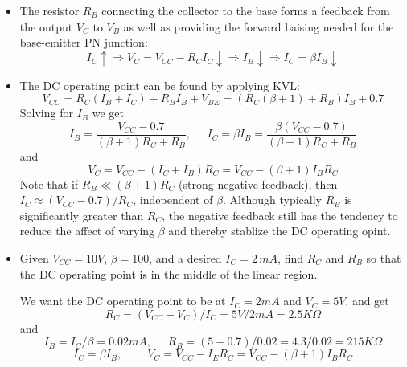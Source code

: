 \documentclass{article}
\begin{document}
\begin{itemize}
\item The resistor $R_B$ connecting the collector to the base forms
  a feedback from the output $V_C$ to $V_B$ as well as providing 
  the forward baising needed for the base-emitter PN junction:
  \begin{equation}
    I_C \uparrow \Longrightarrow V_C=V_{CC}-R_CI_C \downarrow 
    \Longrightarrow I_B\downarrow \Longrightarrow 
    I_C=\beta I_B \downarrow
  \end{equation}

\item The DC operating point can be found by applying KVL:
  \begin{equation}
    V_{CC}=R_C(I_B+I_C)+R_BI_B+V_{BE}=(R_C(\beta+1)+R_B)I_B+0.7
  \end{equation}
  Solving for $I_B$ we get
  \begin{equation} 
    I_B=\frac{V_{CC}-0.7}{(\beta+1)R_C+R_B},\;\;\;\;\;
    I_C=\beta I_B=\frac{\beta(V_{CC}-0.7)}{(\beta+1)R_C+R_B}  
  \end{equation}
  and
  \begin{equation}
    V_C=V_{CC}-(I_C+I_B)R_C=V_{CC}-(\beta+1)I_BR_C
  \end{equation}
  Note that if $R_B \ll (\beta+1)R_C $ (strong negative feedback), 
  then $I_C \approx (V_{CC}-0.7)/R_C$, independent of $\beta$. 
  Although typically $R_B$ is significantly greater than $R_C$, 
  the negative feedback still has the tendency to reduce the affect
  of varying $\beta$ and thereby stablize the DC operating opint.

\item Given $V_{CC}=10V$, $\beta=100$, and a desired $I_C=2\,mA$, find
  $R_C$ and $R_B$ so that the DC operating point is in the middle of the 
  linear region.
  
  We want the DC operating point to be at $I_C=2mA$ and $V_C=5V$, and
  get
  \begin{equation}
  R_C=(V_{CC}-V_C)/I_C=5V/2mA=2.5K\Omega
  \end{equation}
  and
  \begin{equation}
  I_B=I_C/\beta=0.02mA, \;\;\;\;\;R_B=(5-0.7)/0.02=4.3/0.02=215K\Omega
  \end{equation}
  \begin{equation}
  I_C=\beta I_B,\;\;\;\;\;\;\;\;V_C=V_{CC}-I_ER_C=V_{CC}-(\beta+1)I_BR_C
  \end{equation}


\end{itemize}
\end{document}
